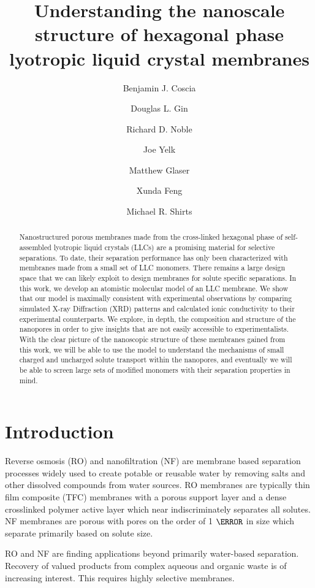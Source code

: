\documentclass{article}
\title{Understanding the nanoscale structure of hexagonal phase
lyotropic liquid crystal membranes}
\author{Benjamin J. Coscia \and Douglas L. Gin \and Richard D. Noble
\and Joe Yelk \and Matthew Glaser \and Xunda Feng \and Michael R.
Shirts}
\begin{document}
  
  \graphicspath{{./figures/}}
  \maketitle

  \begin{abstract}

  Nanostructured porous membranes made from the cross-linked hexagonal phase of
  self-assembled lyotropic liquid crystals (LLCs) are a promising material for
  selective separations. To date, their separation performance has only been
  characterized with membranes made from a small set of LLC monomers. There
  remains a large design space that we can likely exploit to design membranes for
  solute specific separations. In this work, we develop an atomistic molecular
  model of an LLC membrane. We show that our model is maximally consistent with
  experimental observations by comparing simulated X-ray Diffraction (XRD)
  patterns and calculated ionic conductivity to their experimental counterparts.
  We explore, in depth, the composition and structure of the nanopores in order
  to give insights that are not easily accessible to experimentalists. With the
  clear picture of the nanoscopic structure of these membranes gained from this
  work, we will be able to use the model to understand the mechanisms of small
  charged and uncharged solute transport within the nanopores, and eventually we
  will be able to screen large sets of modified monomers with their separation
  properties in mind.  

  \end{abstract}

  \section{Introduction}
  
  Reverse osmosis (RO) and nanofiltration (NF) are membrane based separation
  processes widely used to create potable or reusable water by removing salts and
  other dissolved compounds from water sources. RO membranes are typically thin
  film composite (TFC) membranes with a porous support layer and a dense
  crosslinked polymer active layer which near indiscriminately separates all solutes.
  NF membranes are porous with pores on the order of 1 $\nm$ in size which separate 
  primarily based on solute size.   

  RO and NF are finding applications beyond primarily water-based
  separation. Recovery of valued products from complex aqueous and organic waste
  is of increasing interest. This requires highly selective membranes.
\end{document}
